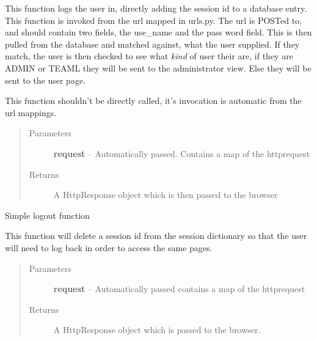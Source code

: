 \documentclass[letterpaper,10pt,english]{sphinxmanual}
\begin{document}

\begin{fulllineitems}
\label{timetracker:timetracker.views.login}
This function logs the user in, directly adding the session id to
a database entry. This function is invoked from the url mapped in urls.py.
The url is POSTed to, and should contain two fields, the use\_name and the
pass word field. This is then pulled from the database and matched
against, what the user supplied. If they match, the user is then checked
to see what \emph{kind} of user their are, if they are ADMIN or TEAML they will
be sent to the administrator view. Else they will be sent to the user
page.

This function shouldn't be directly called, it's invocation is automatic
from the url mappings.
\begin{quote}\begin{description}
\item[{Parameters}] \leavevmode
\textbf{request} -- Automatically passed. Contains a map of the httprequest

\item[{Returns}] \leavevmode
A HttpResponse object which is then passed to the browser

\end{description}\end{quote}

\end{fulllineitems}


\begin{fulllineitems}
\label{timetracker:timetracker.views.logout}
Simple logout function

This function will delete a session id from the session dictionary so that
the user will need to log back in order to access the same pages.
\begin{quote}\begin{description}
\item[{Parameters}] \leavevmode
\textbf{request} -- Automatically passed contains a map of the httprequest

\item[{Returns}] \leavevmode
A HttpResponse object which is passed to the browser.

\end{description}\end{quote}

\end{fulllineitems}
\end{document}
